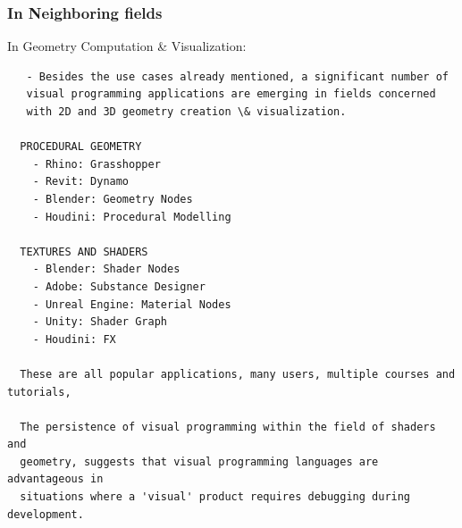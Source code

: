






\subsubsection*{ In Neighboring fields }
In Geometry Computation \& Visualization:

\begin{lstlisting} 
   - Besides the use cases already mentioned, a significant number of 
   visual programming applications are emerging in fields concerned 
   with 2D and 3D geometry creation \& visualization. 

  PROCEDURAL GEOMETRY 
    - Rhino: Grasshopper
    - Revit: Dynamo  
    - Blender: Geometry Nodes
    - Houdini: Procedural Modelling
  
  TEXTURES AND SHADERS
    - Blender: Shader Nodes
    - Adobe: Substance Designer
    - Unreal Engine: Material Nodes
    - Unity: Shader Graph
    - Houdini: FX

  These are all popular applications, many users, multiple courses and tutorials, 

  The persistence of visual programming within the field of shaders and
  geometry, suggests that visual programming languages are advantageous in
  situations where a 'visual' product requires debugging during development. 
\end{lstlisting}

